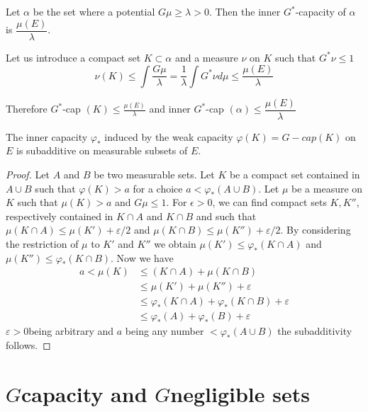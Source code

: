 \begin{prop}\label{p3:chap4:sec9:prop8}%
  Let $\alpha$ be the set where a potential $G \mu \geq\lambda > 0$.  Then
  the inner $G^*$-capacity of $\alpha$ is $\dfrac{\mu (E)}{\lambda}$.  
\end{prop}

Let us introduce a compact set $K \subset \alpha $ and a measure $\nu$
on $K$ such that $G^*\nu \leq 1$ 
$$
\nu (K) \leq \int \frac{G \mu } {\lambda} = \frac{1}{\lambda} \int G^*
\nu d \mu \leq \frac{\mu (E)}{\lambda} 
$$ 

Therefore $G^*$-cap $(K) \leq \frac{\mu (E)}{\lambda}$ and inner
$G^*$-cap $(\alpha)\leq \dfrac{\mu (E)}{\lambda}$  
\begin{prop}\label{p3:chap4:sec9:prop9}%
  The inner capacity $\varphi_*$ induced by the weak capacity
  $\varphi (K) = G - cap (K)$ on $E$ is subadditive on measurable
  subsets of $E$.  
\end{prop} 

\begin{proof}
  Let $A$ and $B$ be two measurable sets. Let $K$ be a compact set
  contained in $A \cup B $ such that $\varphi (K) >a$ for a choice 
  $a< \varphi _* (A \cup B)$. Let $\mu$ be a measure on $K$ such that
  $\mu (K) > a$ and $G \mu \leq 1$. For $\epsilon > 0$, we can find
  compact sets $K, K''$,
  respectively contained in $K \cap A$ and $K \cap B$ and such that
  $\mu (K \cap A)\leq \mu (K') + \varepsilon / 2$ and $\mu (K \cap B)
  \leq  \mu (K'') + \varepsilon / 2$. By considering the restriction of
  $\mu$ to $K'$ and $K''$ we obtain $\mu (K') \leq \varphi _* (K \cap
  A)$ and $ \mu (K'') \leq \varphi _* (K \cap B)$. Now we have  
  \begin{align*}
    a < \mu (K) & \leq ( K \cap A ) + \mu ( K \cap B ) \\
    & \leq \mu (K') + \mu (K'') + \varepsilon \\
    & \leq \varphi_* ( K \cap A ) +\varphi_* ( K \cap B ) + \varepsilon \\
    & \leq \varphi_* (A) + \varphi_* (B) + \varepsilon  
  \end{align*}
  $ \varepsilon > 0$\pageoriginale being arbitrary and $a$ being any number $ <
  \varphi_* ( A \cup B ) $ the subadditivity follows. 
\end{proof}

\section{\texorpdfstring{$G$}-capacity and \texorpdfstring{$G$}-negligible sets}\label{p3:chap4:sec10}

